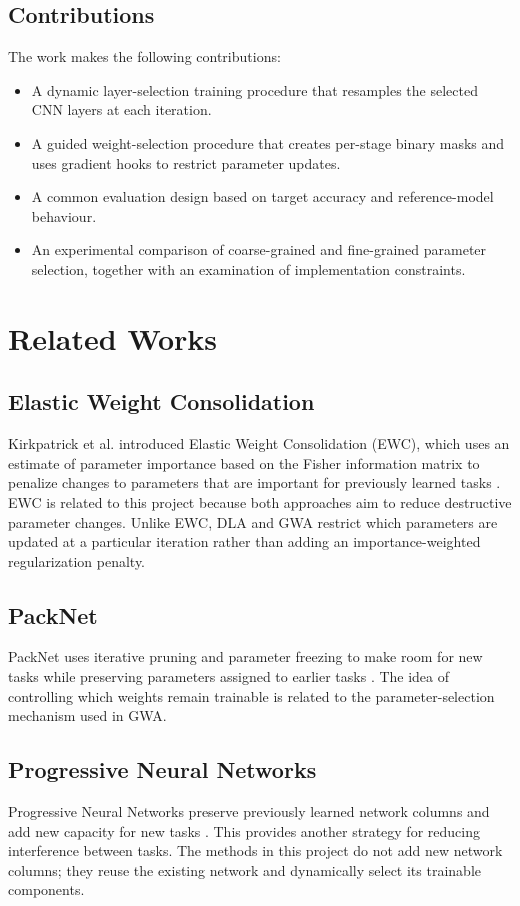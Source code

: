 \documentclass[12pt,a4paper]{report}
\begin{document}
\section{Contributions}
The work makes the following contributions:
\begin{itemize}
    \item A dynamic layer-selection training procedure that resamples
    the selected CNN layers at each iteration.
    \item A guided weight-selection procedure that creates per-stage
    binary masks and uses gradient hooks to restrict parameter updates.
    \item A common evaluation design based on target accuracy and
    reference-model behaviour.
    \item An experimental comparison of coarse-grained and
    fine-grained parameter selection, together with an examination of
    implementation constraints.
\end{itemize}

\chapter{Related Works}

\section{Elastic Weight Consolidation}
Kirkpatrick et al. introduced Elastic Weight Consolidation (EWC), which
uses an estimate of parameter importance based on the Fisher
information matrix to penalize changes to parameters that are important
for previously learned tasks \cite{ewc}. EWC is related to this project
because both approaches aim to reduce destructive parameter changes.
Unlike EWC, DLA and GWA restrict which parameters are updated at a
particular iteration rather than adding an importance-weighted
regularization penalty.

\section{PackNet}
PackNet uses iterative pruning and parameter freezing to make room for
new tasks while preserving parameters assigned to earlier tasks
\cite{packnet}. The idea of controlling which weights remain trainable
is related to the parameter-selection mechanism used in GWA.

\section{Progressive Neural Networks}
Progressive Neural Networks preserve previously learned network columns
and add new capacity for new tasks \cite{progressive}. This provides
another strategy for reducing interference between tasks. The methods
in this project do not add new network columns; they reuse the existing
network and dynamically select its trainable components.
\end{document}
